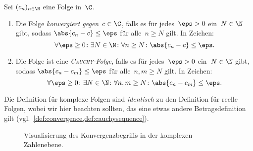 \documentclass[a4paper]{article}
\begin{document}
\begin{definition}
    Sei $(c_n)_{n\in\N}$ eine Folge in~$\C$.
    \begin{enumerate}
        \item Die Folge \emph{konvergiert gegen~$c \in \C$}, falls es für jedes~$\eps > 0$ ein~$N \in \N$ gibt, sodass $\abs{c_n-c} \leq \eps$ für alle~$n \geq N$ gilt. In Zeichen:
              \begin{equation*}
                  \forall \eps \geq 0\colon \exists N \in \N\colon \forall n \geq N\colon \abs{c_n-c} \leq \eps.
              \end{equation*}
        \item Die Folge ist eine \emph{\textsc{Cauchy}-Folge}, falls es für jedes~$\eps > 0$ ein~$N \in \N$ gibt, sodass $\abs{c_n-c_m} \leq \eps$ für alle~$n,m \geq N$ gilt. In Zeichen:
              \begin{equation*}
                  \forall \eps \geq 0\colon \exists N \in \N\colon \forall n,m \geq N\colon \abs{c_n-c_m} \leq \eps.
              \end{equation*}
    \end{enumerate}
\end{definition}

Die Definition für komplexe Folgen sind \emph{identisch} zu den Definition für reelle Folgen, wobei wir hier beachten sollten, das eine etwas andere Betragsdefinition gilt (vgl.\ \cref{def:convergence,def:cauchysequence}).

\begin{figure}
    \caption{Visualisierung des Konvergenzbegriffs in der komplexen Zahlenebene.}
\end{figure}
\end{document}
